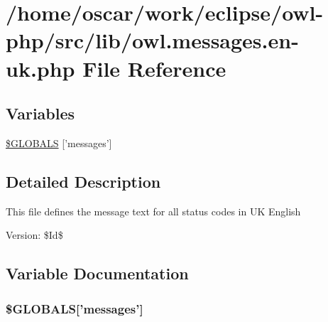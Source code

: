 \hypertarget{owl_8messages_8en-uk_8php}{
\section{/home/oscar/work/eclipse/owl-php/src/lib/owl.messages.en-uk.php File Reference}
\label{owl_8messages_8en-uk_8php}
}
\subsection*{Variables}
\begin{CompactItemize}
\item 
\hyperlink{owl_8messages_8en-uk_8php_65f2996116eed36e9ab25f254a470259}{\$GLOBALS} \mbox{[}'messages'\mbox{]}
\end{CompactItemize}


\subsection{Detailed Description}
This file defines the message text for all status codes in UK English \begin{Desc}
\item[Version:]\$Id\$ \end{Desc}


\subsection{Variable Documentation}
\hypertarget{owl_8messages_8en-uk_8php_65f2996116eed36e9ab25f254a470259}{
\subsubsection{\setlength{\rightskip}{0pt plus 5cm}\$GLOBALS\mbox{[}'messages'\mbox{]}}}
\label{owl_8messages_8en-uk_8php_65f2996116eed36e9ab25f254a470259}


